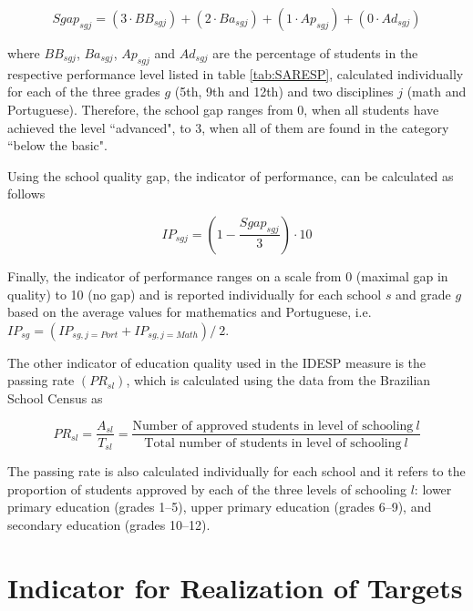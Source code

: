 \documentclass[a4paper, 12pt]{article}
\begin{document}
\begin{equation} \label{eq:Sgap}
Sgap_{sgj} = (3 \cdot BB_{sgj}) + (2 \cdot Ba_{sgj}) + (1 \cdot Ap_{sgj}) + (0 \cdot Ad_{sgj})
\end{equation}

where $BB_{sgj}$, $Ba_{sgj}$, $Ap_{sgj}$ and $Ad_{sgj}$ are the percentage of students in the respective performance level listed in table \ref{tab:SARESP}, calculated individually for each of the three grades $g$ (5th, 9th and 12th) and two disciplines $j$ (math and Portuguese). Therefore, the school gap ranges from 0, when all students have achieved the level ``advanced", to 3, when all of them are found in the category ``below the basic".

Using the school quality gap, the indicator of performance, can be calculated as follows 

\begin{equation} \label{eq:IndPerformance}
IP_{sgj} = \left(1 - \frac{Sgap_{sgj}}{3}\right) \cdot 10
\end{equation}

Finally, the indicator of performance ranges on a scale from 0 (maximal gap in quality) to 10 (no gap) and is reported individually for each school $s$ and grade $g$ based on the average values for mathematics and Portuguese, i.e. $IP_{sg} = \left(IP_{sg,j=Port} + IP_{sg,j=Math}\right) / \: 2$.

The other indicator of education quality used in the IDESP measure is the passing rate $(PR_{sl})$, which is calculated using the data from the Brazilian School Census as


\begin{equation} \label{eq:PassingRate}
PR_{sl} = \frac{A_{sl}}{T_{sl}} = \frac{\text{Number of approved students in level of schooling} \: l}{\text{Total number of students in level of schooling} \: l}
\end{equation}

The passing rate is also calculated individually for each school and it refers to the proportion of students approved by each of the three levels of schooling $l$: lower primary education (grades 1–5), upper primary education (grades 6–9), and secondary education (grades 10–12).




\section{Indicator for Realization of Targets} \label{ICM}
\end{document}
